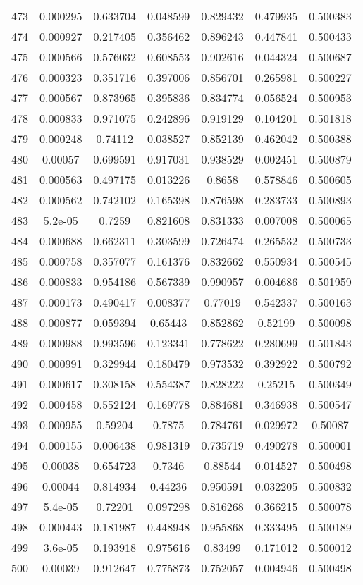 \begin{table}
\begin{tabular}{c|c|c|c|c|c|c}
473 & 0.000295 & 0.633704 & 0.048599 & 0.829432 & 0.479935 & 0.500383\\
474 & 0.000927 & 0.217405 & 0.356462 & 0.896243 & 0.447841 & 0.500433\\
475 & 0.000566 & 0.576032 & 0.608553 & 0.902616 & 0.044324 & 0.500687\\
476 & 0.000323 & 0.351716 & 0.397006 & 0.856701 & 0.265981 & 0.500227\\
477 & 0.000567 & 0.873965 & 0.395836 & 0.834774 & 0.056524 & 0.500953\\
478 & 0.000833 & 0.971075 & 0.242896 & 0.919129 & 0.104201 & 0.501818\\
479 & 0.000248 & 0.74112 & 0.038527 & 0.852139 & 0.462042 & 0.500388\\
480 & 0.00057 & 0.699591 & 0.917031 & 0.938529 & 0.002451 & 0.500879\\
481 & 0.000563 & 0.497175 & 0.013226 & 0.8658 & 0.578846 & 0.500605\\
482 & 0.000562 & 0.742102 & 0.165398 & 0.876598 & 0.283733 & 0.500893\\
483 & 5.2e-05 & 0.7259 & 0.821608 & 0.831333 & 0.007008 & 0.500065\\
484 & 0.000688 & 0.662311 & 0.303599 & 0.726474 & 0.265532 & 0.500733\\
485 & 0.000758 & 0.357077 & 0.161376 & 0.832662 & 0.550934 & 0.500545\\
486 & 0.000833 & 0.954186 & 0.567339 & 0.990957 & 0.004686 & 0.501959\\
487 & 0.000173 & 0.490417 & 0.008377 & 0.77019 & 0.542337 & 0.500163\\
488 & 0.000877 & 0.059394 & 0.65443 & 0.852862 & 0.52199 & 0.500098\\
489 & 0.000988 & 0.993596 & 0.123341 & 0.778622 & 0.280699 & 0.501843\\
490 & 0.000991 & 0.329944 & 0.180479 & 0.973532 & 0.392922 & 0.500792\\
491 & 0.000617 & 0.308158 & 0.554387 & 0.828222 & 0.25215 & 0.500349\\
492 & 0.000458 & 0.552124 & 0.169778 & 0.884681 & 0.346938 & 0.500547\\
493 & 0.000955 & 0.59204 & 0.7875 & 0.784761 & 0.029972 & 0.50087\\
494 & 0.000155 & 0.006438 & 0.981319 & 0.735719 & 0.490278 & 0.500001\\
495 & 0.00038 & 0.654723 & 0.7346 & 0.88544 & 0.014527 & 0.500498\\
496 & 0.00044 & 0.814934 & 0.44236 & 0.950591 & 0.032205 & 0.500832\\
497 & 5.4e-05 & 0.72201 & 0.097298 & 0.816268 & 0.366215 & 0.500078\\
498 & 0.000443 & 0.181987 & 0.448948 & 0.955868 & 0.333495 & 0.500189\\
499 & 3.6e-05 & 0.193918 & 0.975616 & 0.83499 & 0.171012 & 0.500012\\
500 & 0.00039 & 0.912647 & 0.775873 & 0.752057 & 0.004946 & 0.500498\\
\end{tabular}
\end{table}
